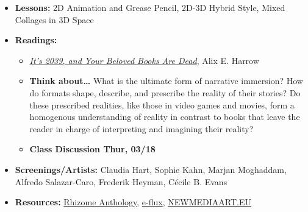 \def\dMon{Mon, 03/15}
\def\dTues{Tues, 03/16}
\def\dWed{Wed, 03/17}
\def\dThur{Thur, 03/18}
\def\dFri{Fri, 03/19}
\def\dSat{Sat, 03/20}
\def\dSun{Sun, 03/21}
\placeDate





% 
\begin{itemize}[noitemsep,topsep=0pt,leftmargin=*]
    \item \textbf{Lessons:} 2D Animation and Grease Pencil, 2D-3D Hybrid Style, Mixed Collages in 3D Space
    \item \textbf{Readings:}
          \begin{itemize}
              \item \href{https://www.nytimes.com/2019/12/02/opinion/future-virtual-reality-stories.html}{\emph{It’s 2039, and Your Beloved Books Are Dead}}, Alix E. Harrow
              \item \textbf{Think about\dots} What is the ultimate form of narrative immersion? How do formats shape, describe, and prescribe the reality of their stories? Do these prescribed realities, like those in video games and movies, form a homogenous understanding of reality in contrast to books that leave the reader in charge of interpreting and imagining their reality?
              \item \textbf{Class Discussion \dThur}
          \end{itemize}
    \item \textbf{Screenings/Artists:} Claudia Hart, Sophie Kahn, Marjan Moghaddam, Alfredo Salazar-Caro, Frederik Heyman, Cécile B. Evans
    \item \textbf{Resources:} \href{https://anthology.rhizome.org/}{Rhizome Anthology}, \href{https://www.e-flux.com/journal/}{e-flux}, \href{https://www.newmediaart.eu/}{NEWMEDIAART.EU}
\end{itemize}
